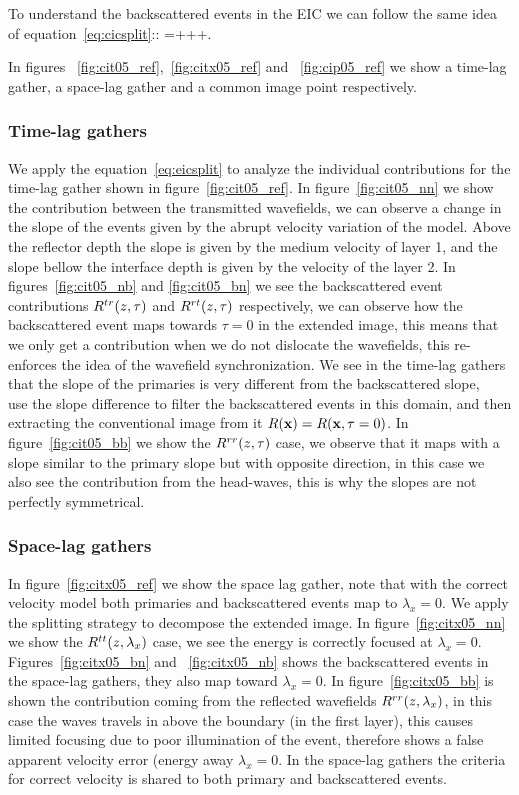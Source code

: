 To understand the backscattered events in the EIC we can follow the same idea of equation~\ref{eq:cicsplit}::
\beq
\Re=+++.
\label{eq:eicsplit}
\eeq

In figures ~\ref{fig:cit05_ref},~\ref{fig:citx05_ref} and ~\ref{fig:cip05_ref} we show a time-lag gather, a space-lag gather
 and a common image point respectively.

\subsubsection{Time-lag gathers}

We apply the equation~\ref{eq:eicsplit} to analyze the individual contributions
for the time-lag gather shown in figure~\ref{fig:cit05_ref}. In figure~\ref{fig:cit05_nn} we show the contribution between
the transmitted wavefields, we can observe a change in the slope of the events given by the abrupt velocity variation of the model. 
Above the reflector depth the slope is given by the medium velocity of layer 1, and the slope bellow the interface depth is given
 by the velocity of the layer 2. In figures~\ref{fig:cit05_nb} and \ref{fig:cit05_bn} we see the backscattered
 event contributions $R^{tr}(z,\tau)$ and $R^{rt}(z,\tau)$ respectively, we can observe how the backscattered event maps towards $\tau=0$
in the extended image, this means that we only get a contribution when we do not dislocate the wavefields, this re-enforces
the idea of the wavefield synchronization. We see in the time-lag gathers that the slope of the primaries is very different
from the backscattered slope, ~\cite{kaelin:3125} use the slope difference to filter the backscattered 
events in this domain, and then extracting the conventional image from it $R({\bf x})=R({\bf x},\tau=0)$. In figure~\ref{fig:cit05_bb} 
we show the $R^{rr}(z,\tau)$ case, we observe that it maps with a slope similar to the primary slope but with opposite direction, 
in this case we also see the contribution from the head-waves, this is why the slopes are not perfectly symmetrical.

\subsubsection{Space-lag gathers}

In figure~\ref{fig:citx05_ref} we show the space lag gather, note that with the correct velocity model both primaries and
backscattered events map to $\lambda_x=0$. We apply the splitting strategy to decompose the extended image. In figure~\ref{fig:citx05_nn}
we show the $R^{tt}(z,\lambda_x)$ case, we see the energy is correctly focused at $\lambda_x=0$. Figures~\ref{fig:citx05_bn} and ~\ref{fig:citx05_nb}
shows the backscattered events in the space-lag gathers, they also map toward $\lambda_x=0$. In figure~\ref{fig:citx05_bb} is shown
the contribution coming from the reflected wavefields $R^{rr}(z,\lambda_x)$, in this case the waves travels in above the boundary (in the first layer),
this causes limited focusing due to poor illumination of the event, therefore shows a false apparent velocity error (energy away $\lambda_x=0$. 
In the space-lag gathers the criteria for correct velocity is shared to both primary and backscattered events.

